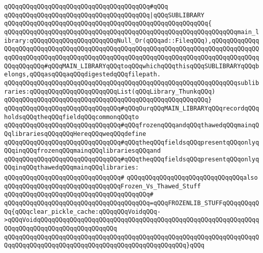 \verb|qQQqqQQqqQQqqQQqqQQqqQQqqQQqqQQqqQQqqQQq#qQQq|\newline
\verb|qQQqqQQqqQQqqQQqqQQqqQQqqQQqqQQqqQQqqQQq|\verb#|qQQqSUBLIBRARY#\newline
\verb|qQQqqQQqqQQqqQQqqQQqqQQqqQQqqQQqqQQqqQQqqQQqqQQqqQQqqQQq{|\newline
\verb|qQQqqQQqqQQqqQQqqQQqqQQqqQQqqQQqqQQqqQQqqQQqqQQqqQQqqQQqqQQqqQQqmain_library:qQQqqQQqqQQqqQQqqQQqqQQqNull_Or(qQQqad::FileqQQq),qQQqqQQqqQQqqQQqqQQqqQQqqQQqqQQqqQQqqQQqqQQqqQQqqQQqqQQqqQQqqQQqqQQqqQQqqQQqqQQqqQQqqQQqqQQqqQQqqQQqqQQqqQQqqQQqqQQqqQQqqQQqqQQqqQQqqQQqqQQqqQQqqQQqqQQqqQQqqQQqqQQq#qQQqMAIN_LIBRARYqQQqtoqQQqwhichqQQqthisqQQqSUBLIBRARYqQQqbelongs,qQQqasqQQqaqQQqdigestedqQQqfilepath.|\newline
\verb|qQQqqQQqqQQqqQQqqQQqqQQqqQQqqQQqqQQqqQQqqQQqqQQqqQQqqQQqqQQqqQQqsublibraries:qQQqqQQqqQQqqQQqqQQqqQQqList(qQQqLibrary_ThunkqQQq)|\newline
\verb|qQQqqQQqqQQqqQQqqQQqqQQqqQQqqQQqqQQqqQQqqQQqqQQqqQQqqQQq}|\newline
\newline
\newline
\verb|qQQqqQQqqQQqqQQqqQQqqQQqqQQqqQQq#qQQqOurqQQqMAIN_LIBRARYqQQqrecordqQQqholdsqQQqtheqQQqfieldqQQqcommonqQQqto|\newline
\verb|qQQqqQQqqQQqqQQqqQQqqQQqqQQqqQQq#qQQqfrozenqQQqandqQQqthawedqQQqmainqQQqlibrariesqQQqqQQqHereqQQqweqQQqdefine|\newline
\verb|qQQqqQQqqQQqqQQqqQQqqQQqqQQqqQQq#qQQqtheqQQqfieldsqQQqpresentqQQqonlyqQQqinqQQqfrozenqQQqmainqQQqlibrariesqQQqand|\newline
\verb|qQQqqQQqqQQqqQQqqQQqqQQqqQQqqQQq#qQQqtheqQQqfieldsqQQqpresentqQQqonlyqQQqinqQQqthawedqQQqmainqQQqlibraries:|\newline
\verb|qQQqqQQqqQQqqQQqqQQqqQQqqQQqqQQq#|\newline
\verb|qQQqqQQqqQQqqQQqqQQqqQQqqQQqqQQqalso|\newline
\verb|qQQqqQQqqQQqqQQqqQQqqQQqqQQqqQQqFrozen_Vs_Thawed_Stuff|\newline
\verb|qQQqqQQqqQQqqQQqqQQqqQQqqQQqqQQqqQQqqQQq#|\newline
\verb|qQQqqQQqqQQqqQQqqQQqqQQqqQQqqQQqqQQqqQQq=qQQqFROZENLIB_STUFFqQQqqQQqqQQq{qQQqclear_pickle_cache:qQQqqQQqVoidqQQq->qQQqVoidqQQqqQQqqQQqqQQqqQQqqQQqqQQqqQQqqQQqqQQqqQQqqQQqqQQqqQQqqQQqqQQqqQQqqQQqqQQqqQQqqQQqqQQqqQQq|\newline
\verb|qQQqqQQqqQQqqQQqqQQqqQQqqQQqqQQqqQQqqQQqqQQqqQQqqQQqqQQqqQQqqQQqqQQqqQQqqQQqqQQqqQQqqQQqqQQqqQQqqQQqqQQqqQQqqQQqqQQqqQQq}qQQq|\newline
